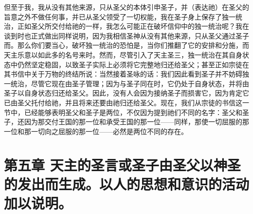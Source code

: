 但至于我，我从没有其他来源，只从圣父的本体引申圣子，并（表达祂）在圣父的旨意之外不做任何事，并已从圣父领受了一切权能，我在圣子身上保存了独一统治，正如圣父所交付给祂的一样，我怎么可能正在破坏信仰中的独一统治呢？我在谈到时也正式做出同样说明，因为我相信圣神从没有其他来源，只从圣父通过圣子而。那么你们要当心，破坏独一统治的恐怕是，当你们推翻了它的安排和分施，而天主乐意以如此多的名号来时。然而，尽管引入了天主圣三，独一统治在其自身状态中仍然坚定稳固，以致圣子实际上必须将它完整地归还给圣父；甚至正如宗徒在其书信中关于万物的终结所说：当然接着圣咏的话：我们因此看到圣子并不妨碍独一统治，尽管它现在由圣子管理；因为与圣子同在时，它仍处于自身状态，并将由圣子以自身状态归还给圣父。因此，没有人会因为接纳圣子而损害它，因为肯定它已由圣父托付给祂，并且将来还要由祂归还给圣父。现在，我们从宗徒的书信这一节中，已经能够表明圣父和圣子是两位，不仅因为提到祂们不同的名字：圣父和圣子，还因为那交付王国的那一位和承受王国的那一位——同样，那使一切屈服的那一位和那一切向之屈服的那一位——必然是两位不同的存在。\par


\section{第五章 天主的圣言或圣子由圣父以神圣的发出而生成。以人的思想和意识的活动加以说明。}

